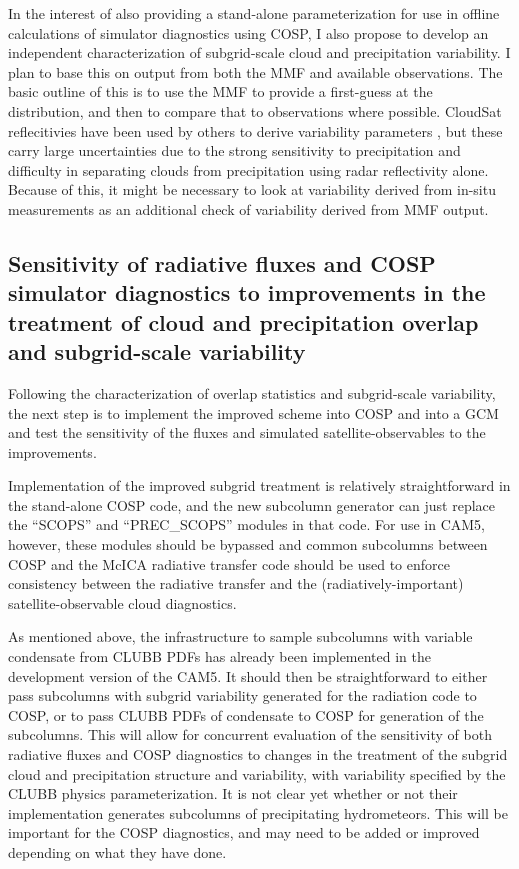 \documentclass[letter]{article}
\begin{document}
In the interest of also providing a stand-alone parameterization for use in offline calculations of simulator diagnostics using COSP, I also propose to develop an independent characterization of subgrid-scale cloud and precipitation variability. I plan to base this on output from both the MMF and available observations. The basic outline of this is to use the MMF to provide a first-guess at the distribution, and then to compare that to observations where possible. CloudSat reflecitivies have been used by others to derive variability parameters \citep{oreopoulos_et_al_2012}, but these carry large uncertainties due to the strong sensitivity to precipitation and difficulty in separating clouds from precipitation using radar reflectivity alone. Because of this, it might be necessary to look at variability derived from in-situ measurements as an additional check of variability derived from MMF output.

\subsection{Sensitivity of radiative fluxes and COSP simulator diagnostics to improvements in the treatment of cloud and precipitation overlap and subgrid-scale variability}
Following the characterization of overlap statistics and subgrid-scale variability, the next step is to implement the improved scheme into COSP and into a GCM and test the sensitivity of the fluxes and simulated satellite-observables to the improvements. 

Implementation of the improved subgrid treatment is relatively straightforward in the stand-alone COSP code, and the new subcolumn generator can just replace the ``SCOPS'' and ``PREC\_SCOPS'' modules in that code. For use in CAM5, however, these modules should be bypassed and common subcolumns between COSP and the McICA radiative transfer code should be used to enforce consistency between the radiative transfer and the (radiatively-important) satellite-observable cloud diagnostics. 

As mentioned above, the infrastructure to sample subcolumns with variable condensate from CLUBB PDFs has already been implemented in the development version of the CAM5. It should then be straightforward to either pass subcolumns with subgrid variability generated for the radiation code to COSP, or to pass CLUBB PDFs of condensate to COSP for generation of the subcolumns. This will allow for concurrent evaluation of the sensitivity of both radiative fluxes and COSP diagnostics to changes in the treatment of the subgrid cloud and precipitation structure and variability, with variability specified by the CLUBB physics parameterization. It is not clear yet whether or not their implementation generates subcolumns of precipitating hydrometeors. This will be important for the COSP diagnostics, and may need to be added or improved depending on what they have done.
\end{document}
